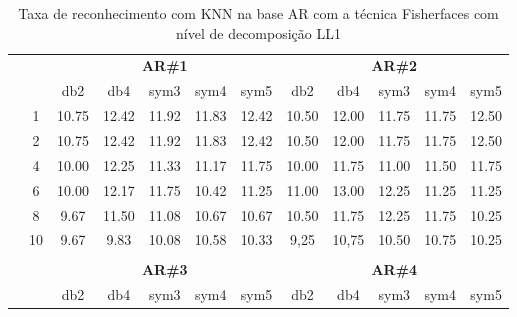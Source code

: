 \begin{table}[H]
	\centering
    \normalsize
	\caption{Taxa de reconhecimento com KNN na base AR com a técnica Fisherfaces com nível de decomposição LL1}
	\begin{tabular}{|c|c|c c c c c|c c c c c|}
\cline{3-12}
\multicolumn{2}{c|}{\multirow{2}{*}{}} & \multicolumn{5}{c|}{\textbf{AR\#1}}  & \multicolumn{5}{c|}{\textbf{AR\#2}} \\\cline{3-12}

\multicolumn{2}{c|}{}  & db2 & db4 & sym3 & sym4 & sym5 & db2 & db4& sym3 & sym4 & sym5 \\\hline

\multicolumn{1}{|c|}{ \multirow{5}{*}{\rotatebox[origin=c]{90}{\textbf{K-vizinhos}}} }
&1	&10.75	&12.42	&11.92&	11.83&	12.42&	10.50&	12.00&	11.75&	11.75&	12.50	\\\cline{2-12}
&2	&10.75  &12.42	&11.92&	11.83&	12.42&	10.50&	12.00&	11.75&	11.75&	12.50	\\\cline{2-12}
&4	&10.00	&12.25	&11.33&	11.17&	11.75&	10.00&	11.75&	11.00&	11.50&	11.75	\\\cline{2-12}
&6	&10.00	&12.17	&11.75&	10.42&	11.25&	11.00&	13.00&	12.25&	11.25&	11.25	\\\cline{2-12}
&8	&9.67&	11.50	&11.08&	10.67&	10.67&	10.50&	11.75&	12.25&	11.75&	10.25	\\\cline{2-12}
&10 &9.67&	9.83	&10.08&	10.58&	10.33&	9,25&	10,75&	10.50&	10.75&	10.25	



\\ \midrule
\multicolumn{12}{c}{}\\ 




\cline{3-12}
\multicolumn{2}{c}{} & \multicolumn{5}{|c|}{\textbf{AR\#3}}  & \multicolumn{5}{c|}{\textbf{AR\#4}} \\\cline{3-12}
\multicolumn{2}{c}{}  & \multicolumn{1}{|c}{db2} & db4 & sym3 & sym4 & sym5 & db2 & db4& sym3 & sym4 & sym5 \\\hline


\end{tabular}
\end{table}

